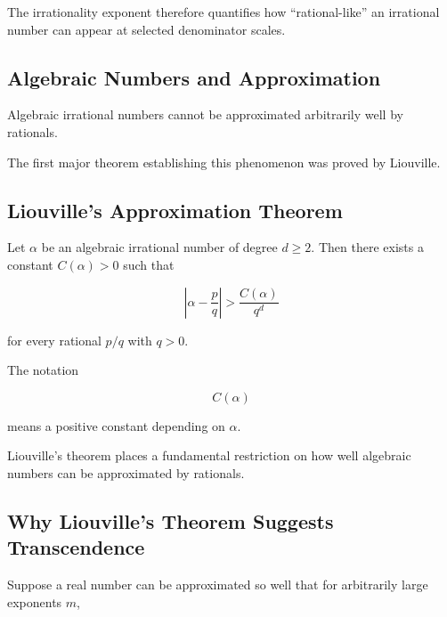 The irrationality exponent therefore quantifies how ``rational-like'' an
irrational number can appear at selected denominator scales.

\subsection{Algebraic Numbers and Approximation}
\label{subsec:algebraic-number-approximation}

Algebraic irrational numbers cannot be approximated arbitrarily well by
rationals.

The first major theorem establishing this phenomenon was proved by
Liouville.

\subsection{Liouville's Approximation Theorem}
\label{subsec:liouville-approximation-theorem}

\begin{theorem}[Liouville]
Let \(\alpha\) be an algebraic irrational number of degree \(d\geq2\).
Then there exists a constant \(C(\alpha)>0\) such that

\[ \boxed{\left|\alpha-\frac pq\right|>\frac{C(\alpha)}{q^d}} \]

for every rational \(p/q\) with \(q>0\).
\end{theorem}

The notation

\[ C(\alpha) \]

means a positive constant depending on \(\alpha\).

Liouville's theorem places a fundamental restriction on how well algebraic
numbers can be approximated by rationals.

\subsection{Why Liouville's Theorem Suggests Transcendence}
\label{subsec:liouville-transcendence-idea}

Suppose a real number can be approximated so well that for arbitrarily large
exponents \(m\),

